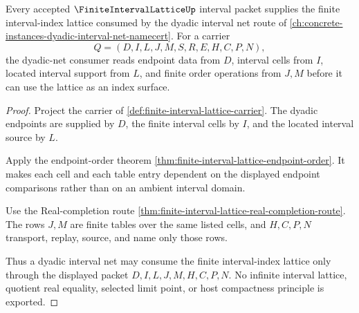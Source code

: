\begin{theorem}
\label{thm:finite-interval-lattice-dyadic-net-forward-link}
Every accepted $\FiniteIntervalLatticeUp$ interval packet supplies the finite interval-index lattice consumed by the dyadic interval net route of \autoref{ch:concrete-instances-dyadic-interval-net-namecert}. For a carrier
$$
Q=(D,I,L,J,M,S,R,E,H,C,P,N),
$$
the dyadic-net consumer reads endpoint data from $D$, interval cells from $I$, located interval support from $L$, and finite order operations from $J,M$ before it can use the lattice as an index surface.
\end{theorem}
\begin{proof}
Project the carrier of \autoref{def:finite-interval-lattice-carrier}. The dyadic endpoints are supplied by $D$, the finite interval cells by $I$, and the located interval source by $L$.

Apply the endpoint-order theorem \autoref{thm:finite-interval-lattice-endpoint-order}. It makes each cell and each table entry dependent on the displayed endpoint comparisons rather than on an ambient interval domain.

Use the Real-completion route \autoref{thm:finite-interval-lattice-real-completion-route}. The rows $J,M$ are finite tables over the same listed cells, and $H,C,P,N$ transport, replay, source, and name only those rows.

Thus a dyadic interval net may consume the finite interval-index lattice only through the displayed packet $D,I,L,J,M,H,C,P,N$. No infinite interval lattice, quotient real equality, selected limit point, or host compactness principle is exported.
\end{proof}
